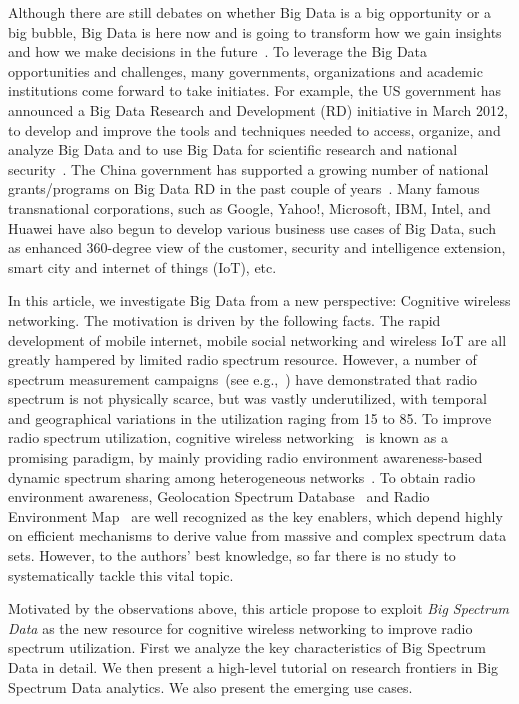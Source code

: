 \documentclass[12pt,draftcls,journal,letterpaper,oneside,onecolumn]{IEEEtran}
\begin{document}
Although there are still debates on whether Big Data is a big opportunity or a big bubble, Big Data is here now and is going to transform how we gain insights and how we make decisions in the future~\cite{Viktor}. To leverage the Big Data opportunities and challenges, many governments, organizations and academic institutions come forward to take initiates. For example, the US government has announced a Big Data Research and Development (RD) initiative in March 2012, to develop and improve the tools and techniques needed to access, organize, and analyze Big Data and to use Big Data for scientific research and national security~\cite{White-house}. The China government has supported a growing number of national grants/programs on Big Data RD in the past couple of years~\cite{China-NSF}. Many famous transnational corporations, such as Google, Yahoo!, Microsoft, IBM, Intel, and Huawei have also begun to develop various business use cases of Big Data, such as enhanced 360-degree view of the customer, security and intelligence extension, smart city and internet of things (IoT), etc.




In this article, we investigate Big Data from a new perspective: Cognitive wireless networking. The motivation is driven by the following facts. The rapid development of mobile internet, mobile social networking and wireless IoT are all greatly hampered by limited radio spectrum resource. However, a number of spectrum measurement campaigns~(see e.g.,~\cite{Spectrum_prediction,Spectrum_models}) have demonstrated that radio spectrum is not physically scarce, but was vastly underutilized, with temporal and geographical variations in the utilization raging from 15 to 85. To improve radio spectrum utilization, cognitive wireless networking~\cite{Haykin_2005} is known as a promising paradigm, by mainly providing radio environment awareness-based dynamic spectrum sharing among heterogeneous networks~\cite{SPMag2013}. To obtain radio environment awareness, Geolocation Spectrum Database~\cite{Senseless_2012} and Radio Environment Map~\cite{REM-MassiveData} are well recognized as the key enablers, which depend highly on efficient mechanisms to derive value from massive and complex spectrum data sets. However, to the authors' best knowledge, so far there is no study to systematically tackle this vital topic.



Motivated by the observations above, this article propose to exploit \emph{Big Spectrum Data} as the new resource for cognitive wireless networking to improve radio spectrum utilization. First we analyze the key characteristics of Big Spectrum Data in detail. We then present a high-level tutorial on research frontiers in Big Spectrum Data analytics. We also present the emerging use cases.
\\
\end{document}
